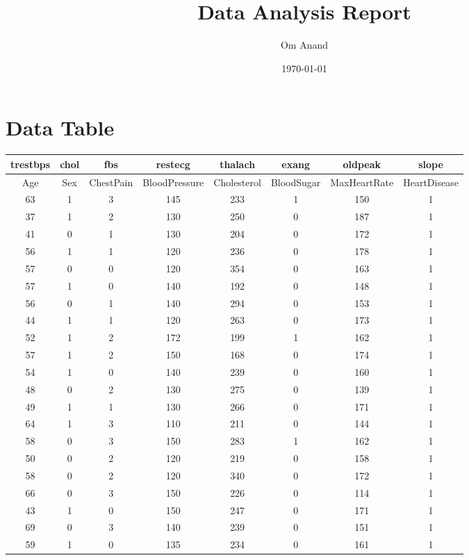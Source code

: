 \documentclass{article}
\title{Data Analysis Report}
\author{Om Anand}
\date{\today}
\begin{document}
\maketitle
\newpage
\section*{Data Table}
\begin{longtable}{|c|c|c|c|c|c|c|c|}
\hline
\textbf{trestbps} & \textbf{chol} & \textbf{fbs} & \textbf{restecg} & \textbf{thalach} & \textbf{exang} & \textbf{oldpeak} & \textbf{slope}\\
\hline
Age & Sex & ChestPain & BloodPressure & Cholesterol & BloodSugar & MaxHeartRate & HeartDisease \\
\hline
63 & 1 & 3 & 145 & 233 & 1 & 150 & 1 \\
\hline
37 & 1 & 2 & 130 & 250 & 0 & 187 & 1 \\
\hline
41 & 0 & 1 & 130 & 204 & 0 & 172 & 1 \\
\hline
56 & 1 & 1 & 120 & 236 & 0 & 178 & 1 \\
\hline
57 & 0 & 0 & 120 & 354 & 0 & 163 & 1 \\
\hline
57 & 1 & 0 & 140 & 192 & 0 & 148 & 1 \\
\hline
56 & 0 & 1 & 140 & 294 & 0 & 153 & 1 \\
\hline
44 & 1 & 1 & 120 & 263 & 0 & 173 & 1 \\
\hline
52 & 1 & 2 & 172 & 199 & 1 & 162 & 1 \\
\hline
57 & 1 & 2 & 150 & 168 & 0 & 174 & 1 \\
\hline
54 & 1 & 0 & 140 & 239 & 0 & 160 & 1 \\
\hline
48 & 0 & 2 & 130 & 275 & 0 & 139 & 1 \\
\hline
49 & 1 & 1 & 130 & 266 & 0 & 171 & 1 \\
\hline
64 & 1 & 3 & 110 & 211 & 0 & 144 & 1 \\
\hline
58 & 0 & 3 & 150 & 283 & 1 & 162 & 1 \\
\hline
50 & 0 & 2 & 120 & 219 & 0 & 158 & 1 \\
\hline
58 & 0 & 2 & 120 & 340 & 0 & 172 & 1 \\
\hline
66 & 0 & 3 & 150 & 226 & 0 & 114 & 1 \\
\hline
43 & 1 & 0 & 150 & 247 & 0 & 171 & 1 \\
\hline
69 & 0 & 3 & 140 & 239 & 0 & 151 & 1 \\
\hline
59 & 1 & 0 & 135 & 234 & 0 & 161 & 1 \\

\end{longtable}
\end{document}
